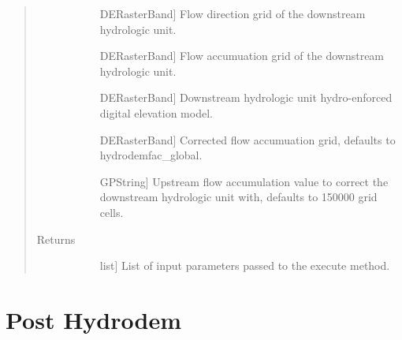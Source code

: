 \documentclass[letterpaper,10pt,english]{sphinxmanual}
\begin{document}
\begin{fulllineitems}
\begin{fulllineitems}
\begin{quote}
\begin{description}
\begin{description}
\item[{}] \leavevmode{[}DERasterBand{]}
Flow direction grid of the downstream hydrologic unit.

\item[{}] \leavevmode{[}DERasterBand{]}
Flow accumuation grid of the downstream hydrologic unit.

\item[{}] \leavevmode{[}DERasterBand{]}
Downstream hydrologic unit hydro-enforced digital elevation model.

\item[{}] \leavevmode{[}DERasterBand{]}
Corrected flow accumuation grid, defaults to hydrodemfac\_global.

\item[{}] \leavevmode{[}GPString{]}
Upstream flow accumulation value to correct the downstream hydrologic unit with, defaults to 150000 grid cells.

\end{description}

\item[{Returns}] \leavevmode\begin{description}
\item[{}] \leavevmode{[}list{]}
List of input parameters passed to the execute method.

\end{description}

\end{description}\end{quote}

\end{fulllineitems}


\end{fulllineitems}



\section{Post Hydrodem}
\label{\detokenize{StreamStats_DataPrep:post-hydrodem}}
\end{document}
